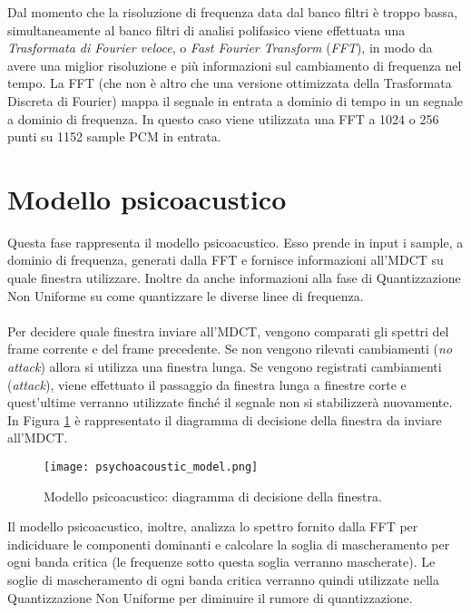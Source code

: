 		Dal momento che la risoluzione di frequenza data dal banco filtri è troppo bassa, simultaneamente al banco filtri di analisi polifasico viene effettuata una \textit{Trasformata di Fourier veloce}, o \textit{Fast Fourier Transform} (\textit{FFT}), in modo da avere una miglior risoluzione e più informazioni sul cambiamento di frequenza nel tempo. La FFT (che non è altro che una versione ottimizzata della Trasformata Discreta di Fourier) mappa il segnale in entrata a dominio di tempo in un segnale a dominio di frequenza. In questo caso viene utilizzata una FFT a 1024 o 256 punti su 1152 sample PCM in entrata.
		
	\section{Modello psicoacustico} \label{sec:modello_psicoacustico}
		
		Questa fase rappresenta il modello psicoacustico. Esso prende in input i sample, a dominio di frequenza, generati dalla FFT e fornisce informazioni all'MDCT su quale finestra utilizzare. Inoltre da anche informazioni alla fase di Quantizzazione Non Uniforme su come quantizzare le diverse linee di frequenza.\\
		\\
		Per decidere quale finestra inviare all'MDCT, vengono comparati gli spettri del frame corrente e del frame precedente. Se non vengono rilevati cambiamenti (\textit{no attack}) allora si utilizza una finestra lunga. Se vengono registrati cambiamenti (\textit{attack}), viene effettuato il passaggio da finestra lunga a finestre corte e quest'ultime verranno utilizzate finché il segnale non si stabilizzerà nuovamente. In Figura \ref{fig:psychoacoustic_model} è rappresentato il diagramma di decisione della finestra da inviare all'MDCT.\\
		
		\begin{figure}[h!]
			\centering
				\texttt{[image: psychoacoustic\_model.png]}
			\caption{Modello psicoacustico: diagramma di decisione della finestra.}
			\label{fig:psychoacoustic_model}
		\end{figure}
		
		Il modello psicoacustico, inoltre, analizza lo spettro fornito dalla FFT per indiciduare le componenti dominanti e calcolare la soglia di mascheramento per ogni banda critica (le frequenze sotto questa soglia verranno mascherate). Le soglie di mascheramento di ogni banda critica verranno quindi utilizzate nella Quantizzazione Non Uniforme per diminuire il rumore di quantizzazione.
		
